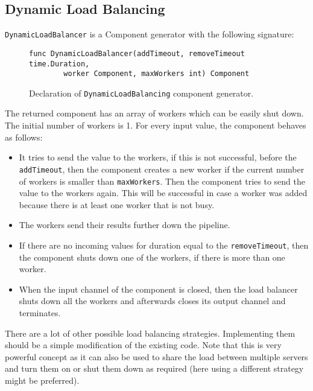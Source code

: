 \documentclass[12pt,a4paper]{article}
\begin{document}
\subsection{Dynamic Load Balancing}
\texttt{DynamicLoadBalancer} is a Component generator with the following signature:
\begin{figure}[h]
\centering
\begin{lstlisting}
func DynamicLoadBalancer(addTimeout, removeTimeout time.Duration, 
        worker Component, maxWorkers int) Component
\end{lstlisting}
\caption[scale=1.0]{Declaration of \texttt{DynamicLoadBalancing} 
component generator.}
\label{fig:loadComp}
\end{figure}

The returned component has an array of workers which can be easily shut down.
The initial number of workers is 1. 
For every input value, the component behaves as follows:
\begin{itemize}
	\item It tries to send the value to the workers, if this is not successful, 
		  before the \texttt{addTimeout}, then the component creates a new worker
          if the current number of workers is smaller than \texttt{maxWorkers}.
          Then the component tries to send the value to the workers again. This will 
          be successful in case a worker was added because there is at least one 
          worker that is not busy.

	\item The workers send their results further down the pipeline.

	\item If there are no incoming values for duration equal to the 
          \texttt{removeTimeout}, then the component shuts down one 
          of the workers, if there is more than one worker.

	\item When the input channel of the component is closed, then the load balancer 
          shuts down all the workers and afterwards closes its output channel and
          terminates.
\end{itemize}
There are a lot of other possible load balancing strategies. 
Implementing them should be a simple modification of the existing code.
Note that this is very powerful concept as it can also be used to share
the load between multiple servers and turn them on or shut them down as
required (here using a different strategy might be preferred).
\end{document}
